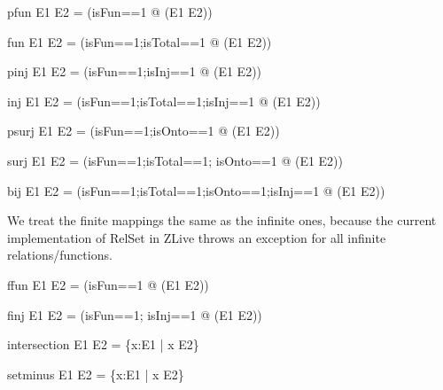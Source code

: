 \documentclass{article}
\begin{document}
\begin{zedrule}{pfun}
   E1 \pfun E2 = (\LET isFun==1 @ \power (E1 \cross E2))
\end{zedrule}

\begin{zedrule}{fun}
   E1 \fun E2 = (\LET isFun==1;isTotal==1 @ \power (E1 \cross E2))
\end{zedrule}

\begin{zedrule}{pinj}
   E1 \pinj E2 = (\LET isFun==1;isInj==1 @ \power (E1 \cross E2))
\end{zedrule}

\begin{zedrule}{inj}
   E1 \inj E2 = (\LET isFun==1;isTotal==1;isInj==1 @ \power (E1 \cross E2))
\end{zedrule}

\begin{zedrule}{psurj}
   E1 \psurj E2 = (\LET isFun==1;isOnto==1 @ \power (E1 \cross E2))
\end{zedrule}

\begin{zedrule}{surj}
   E1 \surj E2 = (\LET isFun==1;isTotal==1; isOnto==1 @ \power (E1 \cross E2))
\end{zedrule}

\begin{zedrule}{bij}
   E1 \bij E2 = (\LET isFun==1;isTotal==1;isOnto==1;isInj==1 
                  @ \power (E1 \cross E2))
\end{zedrule}

We treat the finite mappings the same as the infinite ones,
because the current implementation of RelSet in ZLive
throws an exception for all infinite relations/functions.
\begin{zedrule}{ffun}
   E1 \ffun E2 = (\LET isFun==1 @ \power (E1 \cross E2))
\end{zedrule}

\begin{zedrule}{finj}
   E1 \finj E2 = (\LET isFun==1; isInj==1 @ \power (E1 \cross E2))
\end{zedrule}



\begin{zedrule}{intersection}
   E1 \cap E2 = \{x:E1 | x \in E2\}
\end{zedrule}

\begin{zedrule}{setminus}
   E1 \setminus E2 = \{x:E1 | x \notin E2\}
\end{zedrule}
\end{document}

